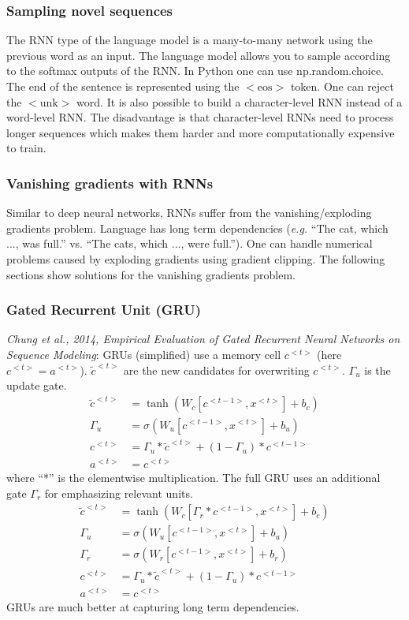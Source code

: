 \documentclass{article}
\begin{document}
\subsubsection{Sampling novel sequences}
The RNN type of the language model is a many-to-many network using the previous word as an input.
The language model allows you to sample according to the softmax outputs of the RNN.
In Python one can use np.random.choice.
The end of the sentence is represented using the $\mathrm{<eos>}$ token.
One can reject the $\mathrm{<unk>}$ word.
It is also possible to build a character-level RNN instead of a word-level RNN.
The disadvantage is that character-level RNNs need to process longer sequences which makes them harder and more computationally expensive to train.

\subsubsection{Vanishing gradients with RNNs}
Similar to deep neural networks, RNNs suffer from the vanishing/exploding gradients problem.
Language has long term dependencies (\emph{e.g.} ``The cat, which ..., was full.'' vs. ``The cats, which ..., were full.'').
One can handle numerical problems caused by exploding gradients using gradient clipping.
The following sections show solutions for the vanishing gradients problem.

\subsubsection{Gated Recurrent Unit (GRU)}
\emph{Chung et al., 2014, Empirical Evaluation of Gated Recurrent Neural Networks on Sequence Modeling}:
GRUs (simplified) use a memory cell $c^{<t>}$ (here $c^{<t>}=a^{<t>}$).
$\tilde{c}^{<t>}$ are the new candidates for overwriting $c^{<t>}$.
$\Gamma_u$ is the update gate.
\begin{equation}
  \begin{split}
    \tilde{c}^{<t>}&=\tanh(W_c[c^{<t-1>},x^{<t>}]+b_c)\\
    \Gamma_u&=\sigma(W_u[c^{<t-1>},x^{<t>}]+b_u)\\
    c^{<t>}&=\Gamma_u*\tilde{c}^{<t>}+(1-\Gamma_u)*c^{<t-1>}\\
    a^{<t>}&=c^{<t>}
  \end{split}
\end{equation}
where ``*'' is the elementwise multiplication.
The full GRU uses an additional gate $\Gamma_r$ for emphasizing relevant units.
\begin{equation}
  \begin{split}
    \tilde{c}^{<t>}&=\tanh(W_c[\Gamma_r*c^{<t-1>},x^{<t>}]+b_c)\\
    \Gamma_u&=\sigma(W_u[c^{<t-1>},x^{<t>}]+b_u)\\
    \Gamma_r&=\sigma(W_r[c^{<t-1>},x^{<t>}]+b_r)\\
    c^{<t>}&=\Gamma_u*\tilde{c}^{<t>}+(1-\Gamma_u)*c^{<t-1>}\\
    a^{<t>}&=c^{<t>}
  \end{split}
\end{equation}
GRUs are much better at capturing long term dependencies.
\end{document}
